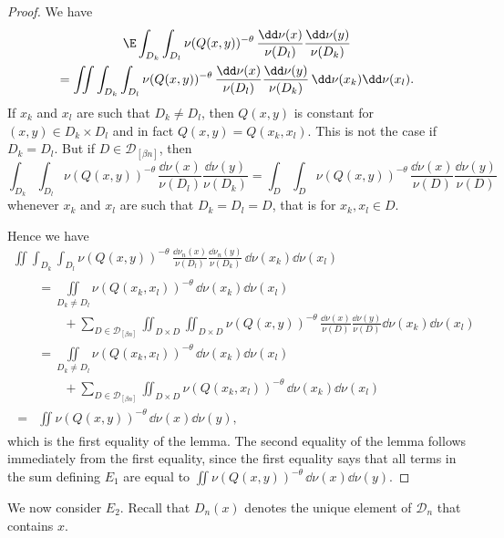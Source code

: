 \begin{proof}
We have
\begin{multline*}
\E \int_{D_k} \int_{D_l} \nu (Q(x,y))^{-\theta} \,
\frac{\dd \nu (x)}{\nu (D_l)} \frac{\dd \nu (y)}{\nu (D_k)} \\ = \iint \int_{D_k} \int_{D_l} \nu (Q(x,y))^{-\theta} \, \frac{\dd \nu (x)}{\nu (D_l)}
\frac{\dd \nu (y)}{\nu (D_k)} \, \dd \nu (x_k)
\dd \nu (x_l).
\end{multline*}
If $x_k$ and $x_l$ are such that $D_k \neq D_l$, then $Q(x,y)$ is constant for $(x,y) \in D_k \times D_l$ and in fact $Q(x,y) = Q(x_k,x_l)$. This is not the case if $D_k = D_l$. But if $D \in
\mathscr{D}_{[\beta n]}$, then
\[
\int_{D_k} \int_{D_l} \nu (Q(x,y))^{-\theta} \, \frac{\dd
\nu (x)}{\nu (D_l)} \frac{\dd \nu (y)}{\nu (D_k)} =
\int_D \int_D \nu (Q(x,y))^{-\theta} \, \frac{\dd \nu (x)}{\nu (D)} \frac{\dd \nu (y)}{\nu (D)}
\]
whenever $x_k$ and $x_l$ are such that $D_k = D_l = D$, that is for $x_k, x_l \in D$.

Hence we have
\begin{multline*}
\iint \int_{D_k} \int_{D_l} \nu (Q(x,y))^{-\theta} \,
\frac{\dd \nu_n (x)}{\nu (D_l)} \frac{\dd \nu_n (y)}{\nu (D_k)} \, \dd \nu (x_k) \dd \nu (x_l)\\
\begin{aligned}
&= \iint\limits_{D_k \neq D_l} \nu (Q(x_k,x_l))^{-\theta} \, \dd\nu (x_k) \dd\nu (x_l) \\
&\qquad + \sum_{D \in
\mathscr{D}_{[\beta n]}} \iint_{D\times D} \iint_{D\times D} \nu (Q(x,y))^{-\theta} \, \frac{\dd \nu (x)}{\nu (D)} \frac{\dd \nu (y)}{\nu (D)} \dd \nu (x_k) \dd
\nu (x_l) \\
&= \iint\limits_{D_k \neq D_l} \nu (Q(x_k,x_l))^{-\theta} \, \dd\nu (x_k) \dd\nu (x_l)\\
&\qquad + \sum_{D \in \mathscr{D}_{[\beta n]}} \iint_{D\times D} \nu (Q(x_k,x_l))^{-\theta} \, \dd \nu (x_k) \dd \nu (x_l) \\ = & \iint \nu(Q(x,y))^{-\theta} \, \dd \nu (x)\dd \nu (y),
\end{aligned}
\end{multline*}
which is the first equality of the lemma. The second equality of the lemma follows immediately from the first equality, since the first equality says that all terms in the sum defining $E_1$ are equal to $\iint \nu(Q(x,y))^{-\theta} \, \dd \nu (x) \dd \nu (y)$.
\end{proof}

We now consider $E_2$. Recall that $D_n (x)$ denotes the unique element of $\mathscr{D}_n$ that contains $x$.


